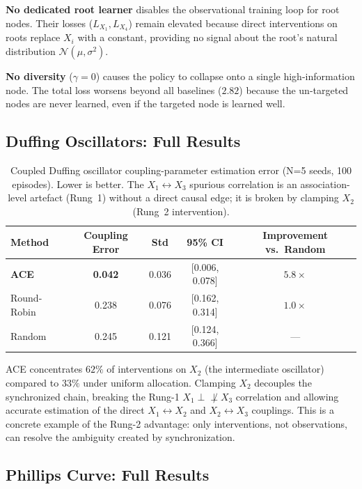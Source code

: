 \textbf{No dedicated root learner} disables the observational training loop for root nodes. Their losses ($L_{X_1}, L_{X_4}$) remain elevated because direct interventions on roots replace $X_i$ with a constant, providing no signal about the root's natural distribution $\mathcal{N}(\mu, \sigma^2)$.

\textbf{No diversity} ($\gamma=0$) causes the policy to collapse onto a single high-information node. The total loss worsens beyond all baselines ($2.82$) because the un-targeted nodes are never learned, even if the targeted node is learned well.

\subsection{Duffing Oscillators: Full Results}
\label{app:duffing}

\begin{table}[h]
\centering
\caption{Coupled Duffing oscillator coupling-parameter estimation error (N=5 seeds, 100 episodes). Lower is better. The $X_1 \leftrightarrow X_3$ spurious correlation is an association-level artefact (Rung~1) without a direct causal edge; it is broken by clamping $X_2$ (Rung~2 intervention).}
\label{tab:duffing-full}
\small
\begin{tabular}{@{}lcccc@{}}
\toprule
Method & Coupling Error & Std & 95\% CI & Improvement vs.\ Random \\
\midrule
\textbf{ACE} & \textbf{0.042} & 0.036 & [0.006, 0.078] & $5.8\times$ \\
Round-Robin  & 0.238 & 0.076 & [0.162, 0.314] & $1.0\times$ \\
Random       & 0.245 & 0.121 & [0.124, 0.366] & --- \\
\bottomrule
\end{tabular}
\end{table}

ACE concentrates $62\%$ of interventions on $X_2$ (the intermediate oscillator) compared to $33\%$ under uniform allocation. Clamping $X_2$ decouples the synchronized chain, breaking the Rung-1 $X_1 \perp\!\!\!\!\not\perp X_3$ correlation and allowing accurate estimation of the direct $X_1 \leftrightarrow X_2$ and $X_2 \leftrightarrow X_3$ couplings. This is a concrete example of the Rung-2 advantage: only interventions, not observations, can resolve the ambiguity created by synchronization.

\subsection{Phillips Curve: Full Results}
\label{app:phillips}

